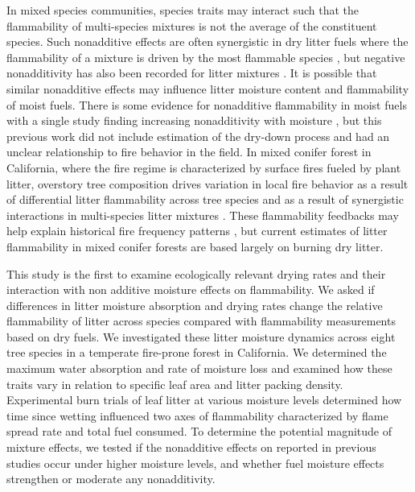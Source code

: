 \documentclass[letterpaper,12pt]{article}
\begin{document}
In mixed species communities, species traits may interact such that the
flammability of multi-species mixtures is not the average of the constituent
species. Such nonadditive effects are often synergistic in dry litter fuels
where the flammability of a mixture is driven by the most flammable species
\citep{VanAltena+Logtestjin+etal-2012, Magalhaes+Schwilk-2012}, but negative
nonadditivity has also been recorded for litter mixtures
\citep{Blauw+Wensink+etal-2015, Zhao+vanLogtestijn+etal-2019}. It is possible
that similar nonadditive effects may influence litter moisture content and
flammability of moist fuels. There is some evidence for nonadditive
flammability in moist fuels with a single study finding increasing nonadditivity
with moisture \citep{Blauw+Wensink+etal-2015}, but this previous work did not
include estimation of the dry-down process and had an unclear relationship to
fire behavior in the field. In mixed conifer forest in California, where the
fire regime is characterized by surface fires fueled by plant litter, overstory
tree composition drives variation in local fire behavior
\citep{Schwilk+Caprio-2011} as a result of differential litter flammability
across tree species and as a result of synergistic interactions in
multi-species litter mixtures \citep{Magalhaes+Schwilk-2012}. These
flammability feedbacks may help explain historical fire frequency patterns
\citep{Schwilk+Caprio-2011}, but current estimates of litter flammability in
mixed conifer forests are based largely on burning dry litter.

This study is the first to examine ecologically relevant drying rates and their
interaction with non additive moisture effects on flammability. We asked if
differences in litter moisture absorption and drying rates change the
relative flammability of litter across species compared with flammability
measurements based on dry fuels. We investigated these litter moisture dynamics
across eight tree species in a temperate fire-prone forest in California. We
determined the maximum water absorption and rate of moisture loss and examined
how these traits vary in relation to specific leaf area and litter packing
density. Experimental burn trials of leaf litter at various moisture levels
determined how time since wetting influenced two axes of flammability
characterized by flame spread rate and total fuel consumed. To determine the
potential magnitude of mixture effects, we tested if the nonadditive effects on
reported in previous studies occur under higher moisture levels, and whether
fuel moisture effects strengthen or moderate any nonadditivity.
\end{document}
